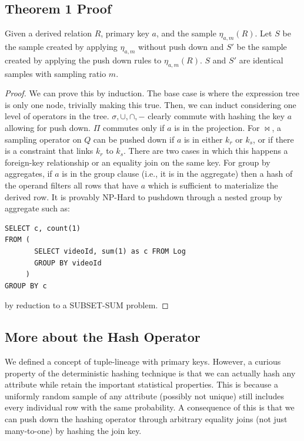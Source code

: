 \subsection{Theorem 1 Proof}
\begin{theorem}
Given a derived relation $R$, primary key $a$, and the sample $\eta_{a, m}(R)$.
Let $S$ be the sample created by applying $\eta_{a, m}$ without push down and 
$S'$ be the sample created by applying the push down rules to $\eta_{a, m}(R)$.
$S$ and $S'$ are identical samples with sampling ratio $m$.
\end{theorem}
\begin{proof}
We can prove this by induction.
The base case is where the expression tree is only one node, trivially making this true.
Then, we can induct considering one level of operators in the tree.
$\sigma, \cup, \cap, -$ clearly commute with hashing the key $a$ allowing for push down.
$\Pi$ commutes only if $a$ is in the projection.
For $\bowtie$, a sampling operator on $Q$ can be pushed down if $a$ is in either $k_r$ or $k_s$, or if there is a constraint that links $k_r$ to $k_s$.
There are two cases in which this happens a foreign-key relationship or an equality join on the same key.
For group by aggregates, if $a$ is in the group clause (i.e., it is in the aggregate) then a hash of the operand filters all rows that have $a$ which is sufficient to materialize the derived row.
It is provably NP-Hard to pushdown through a nested group by aggregate such as:
\begin{lstlisting}
SELECT c, count(1)
FROM ( 
       SELECT videoId, sum(1) as c FROM Log 
       GROUP BY videoId
     )
GROUP BY c
\end{lstlisting}
by reduction to a SUBSET-SUM problem.
\end{proof}

\subsection{More about the Hash Operator}
We defined a concept of tuple-lineage with primary keys.
However, a curious property of the deterministic hashing technique is that we can actually hash any attribute while retain the important statistical properties.
This is because a uniformly random sample of any attribute (possibly not unique) still includes every individual row with the same probability.  
A consequence of this is that we can push down the hashing operator through arbitrary equality joins (not just many-to-one) by hashing the join key.

